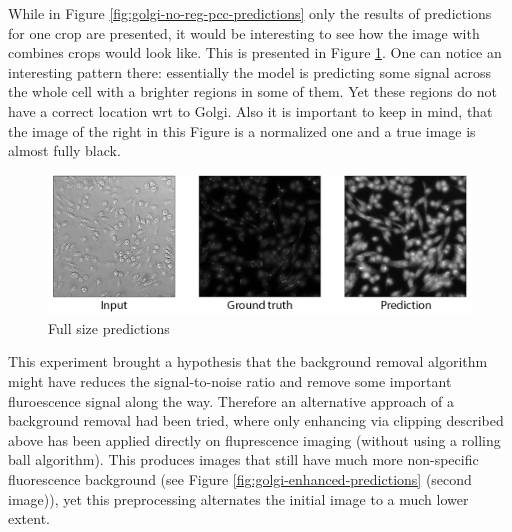 While in Figure \ref{fig:golgi-no-reg-pcc-predictions} only the results of predictions for one crop are presented, it would be interesting to see how the image with combines crops would look like. This is presented in Figure \ref{fig:golgi-no-reg-pcc-predictions-full}. One can notice an interesting pattern there: essentially the model is predicting some signal across the whole cell with a brighter regions in some of them. Yet these regions do not have a correct location wrt to Golgi. Also it is important to keep in mind, that the image of the right in this Figure is a normalized one and a true image is almost fully black.
\begin{figure}[htb]
	\begin{center}
		\includegraphics[width=0.8\linewidth]{bilder/golgi/full-img.png}
		\caption{Full size predictions}\label{fig:golgi-no-reg-pcc-predictions-full}
	\end{center}
\end{figure}

This experiment brought a hypothesis that the background removal algorithm might have reduces the signal-to-noise ratio and remove some important fluroescence signal along the way. Therefore an alternative approach of a background removal had been tried, where only enhancing via clipping described above has been applied directly on fluprescence imaging (without using a rolling ball algorithm). This produces images that still have much more non-specific fluorescence background (see Figure \ref{fig:golgi-enhanced-predictions} (second image)), yet this preprocessing alternates the initial image to a much lower extent.

